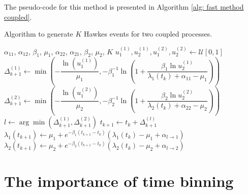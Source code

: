The pseudo-code for this method is presented in Algorithm \ref{alg: fast method coupled}.

\begin{algorithm}[H]
    \caption{Algorithm to generate $K$ Hawkes events for two coupled processes.}\label{alg: fast method coupled}
    \begin{algorithmic}
        \Require $\alpha_{11}$, $\alpha_{12}$, $\beta_1$, $\mu_1$, $\alpha_{22}$, $\alpha_{21}$, $\beta_2$, $\mu_2$, $K$
            \State $u_1^{(1)},u_2^{(1)},u_1^{(2)},u_2^{(2)} \gets \mathcal{U}[0,1]$
            \State $\Delta_{k+1}^{(1)}\gets \min\left( -\dfrac{\ln(u_1^{(1)})}{\mu_1},-\beta_1^{-1}\ln\left( 1+\dfrac{\beta_1\ln u_2^{(1)}}{\lambda_1(t_k)+\alpha_{11}-\mu_1} \right) \right)$
            \State $\Delta_{k+1}^{(2)}\gets \min\left( -\dfrac{\ln(u_1^{(2)})}{\mu_2},-\beta_2^{-1}\ln\left( 1+\dfrac{\beta_2\ln u_2^{(2)}}{\lambda_2(t_k)+\alpha_{22}-\mu_2} \right) \right)$
            \State $l\gets \arg\min\left( \Delta_{k+1}^{(1)},\Delta_{k+1}^{(2)} \right)$
            \State $t_{k+1}\gets t_k+\Delta_{k+1}^{(l)}$
            \State $\lambda_1(t_{k+1}) \gets \mu_1 + e^{-\beta_1(t_{k+1}-t_k)}\left( \lambda_1(t_k)-\mu_1+\alpha_{l\to 1} \right)$
            \State $\lambda_2(t_{k+1}) \gets \mu_2 + e^{-\beta_2(t_{k+1}-t_k)}\left( \lambda_2(t_k)-\mu_2+\alpha_{l\to 2} \right)$
        \EndFor
    \end{algorithmic}
\end{algorithm}


\section{The importance of time binning}\label{sec:physics_cooking}

